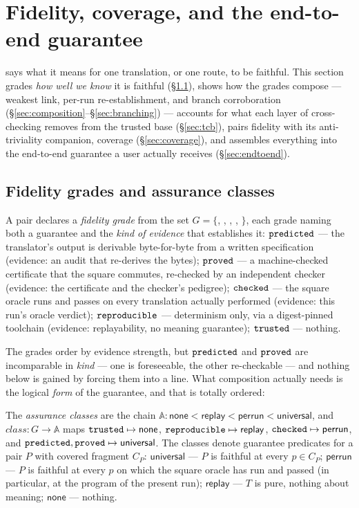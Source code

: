 \section{Fidelity, coverage, and the end-to-end guarantee}
\label{sec:fidelity}

 says what it means for one translation, or one route,
to be faithful. This section grades \emph{how well we know} it is
faithful (\S\ref{sec:grades}), shows how the grades compose --- weakest
link, per-run re-establishment, and branch corroboration
(\S\ref{sec:composition}--\S\ref{sec:branching}) --- accounts for what
each layer of cross-checking removes from the trusted base
(\S\ref{sec:tcb}), pairs fidelity with its anti-triviality companion,
coverage (\S\ref{sec:coverage}), and assembles everything into the
end-to-end guarantee a user actually receives (\S\ref{sec:endtoend}).

\subsection{Fidelity grades and assurance classes}
\label{sec:grades}

A pair declares a \emph{fidelity grade} from the set
$G = \{$\ttrust, \trepr, \tchk, \tpred, \tprov$\}$,
each grade naming both a guarantee and the \emph{kind of evidence} that
establishes it: $\mathtt{predicted}$ --- the translator's output is derivable
byte-for-byte from a written specification (evidence: an audit that
re-derives the bytes); $\mathtt{proved}$ --- a machine-checked certificate that the
square commutes, re-checked by an independent checker (evidence: the
certificate and the checker's pedigree); $\mathtt{checked}$ --- the square oracle
runs and passes on every translation actually performed (evidence:
this run's oracle verdict); $\mathtt{reproducible}$ --- determinism only, via a
digest-pinned toolchain (evidence: replayability, no meaning guarantee);
$\mathtt{trusted}$ --- nothing.

The grades order by evidence strength, but $\mathtt{predicted}$ and $\mathtt{proved}$ are
incomparable in \emph{kind} --- one is foreseeable, the other
re-checkable --- and nothing below is gained by forcing them into a line.
What composition actually needs is the logical \emph{form} of the
guarantee, and that is totally ordered:

\begin{definition}
\label{def:class}
The \emph{assurance classes} are the chain
$\mathbb{A} : \mathsf{none} < \mathsf{replay} < \mathsf{perrun} <
\mathsf{universal}$, and
$\mathit{class} : G \to \mathbb{A}$ maps
$\mathtt{trusted} \mapsto \mathsf{none}$,
$\mathtt{reproducible} \mapsto \mathsf{replay}$,
$\mathtt{checked} \mapsto \mathsf{perrun}$, and
$\mathtt{predicted}, \mathtt{proved} \mapsto \mathsf{universal}$.
The classes denote guarantee predicates for a pair $P$ with covered
fragment $C_P$:
$\mathsf{universal}$ --- $P$ is faithful at every $p \in C_P$;
$\mathsf{perrun}$ --- $P$ is faithful at every $p$ on which the square
oracle has run and passed (in particular, at the program of the present
run);
$\mathsf{replay}$ --- $T$ is pure, nothing about meaning;
$\mathsf{none}$ --- nothing.
\end{definition}

